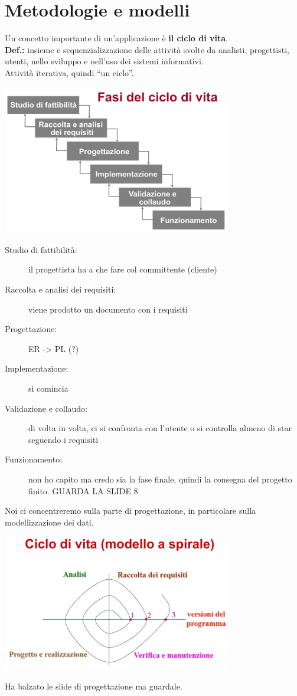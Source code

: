 \section{Metodologie e modelli}
Un concetto importante di un'applicazione è \textbf{il ciclo di vita}.
\\\textbf{Def.:} insieme e sequenzializzazione delle attività svolte da analisti, progettisti, utenti, nello sviluppo e nell’uso dei sistemi informativi.
\\Attività iterativa, quindi “un ciclo”.
\begin{center}
    \includegraphics[width=0.75\textwidth]{chaptersLezioniSara/img/ciclo_di_vita1.jpg}
\end{center}
\begin{description}
    \item[Studio di fattibilità:] il progettista ha a che fare col committente (cliente) 
    \item[Raccolta e analisi dei requisiti:] viene prodotto un documento con i requisiti
    \item[Progettazione:] ER -> PL (?)
    \item[Implementazione:] si comincia
    \item[Validazione e collaudo:] di volta in volta, ci si confronta con l'utente o si controlla almeno di star seguendo i requisiti
    \item[Funzionamento:] non ho capito ma credo sia la fase finale, quindi la consegna del progetto finito. GUARDA LA SLIDE 8
\end{description}
Noi ci concentreremo sulla parte di progettazione, in particolare sulla modellizzazione dei dati.
\begin{center}
    \includegraphics[width=0.75\textwidth]{chaptersLezioniSara/img/ciclo_di_vita2.jpg}
\end{center}
Ha balzato le slide di progettazione ma guardale.

